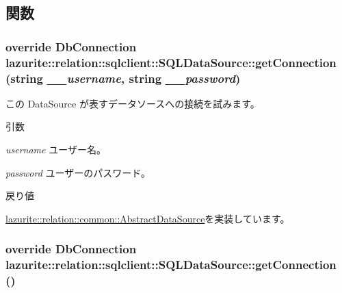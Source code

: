 \subsection{関数}
\hypertarget{classlazurite_1_1relation_1_1sqlclient_1_1_s_q_l_data_source_a49e9bb60b11cb3d984257702a566e869}{
\subsubsection[{getConnection}]{\setlength{\rightskip}{0pt plus 5cm}override DbConnection lazurite::relation::sqlclient::SQLDataSource::getConnection (string {\em \_\-\_\-username}, \/  string {\em \_\-\_\-password})}}
\label{classlazurite_1_1relation_1_1sqlclient_1_1_s_q_l_data_source_a49e9bb60b11cb3d984257702a566e869}


この DataSource が表すデータソースへの接続を試みます。 
\begin{DoxyParams}{引数}
\item[{\em username}]ユーザー名。\item[{\em password}]ユーザーのパスワード。\end{DoxyParams}
\begin{DoxyReturn}{戻り値}

\end{DoxyReturn}


\hyperlink{classlazurite_1_1relation_1_1common_1_1_abstract_data_source_a1e828b5e7c1e29b21439d910f05005aa}{lazurite::relation::common::AbstractDataSource}を実装しています。\hypertarget{classlazurite_1_1relation_1_1sqlclient_1_1_s_q_l_data_source_a99a7bdaa7ca6fce82a89f537a72b2e23}{
\subsubsection[{getConnection}]{\setlength{\rightskip}{0pt plus 5cm}override DbConnection lazurite::relation::sqlclient::SQLDataSource::getConnection ()}}
\label{classlazurite_1_1relation_1_1sqlclient_1_1_s_q_l_data_source_a99a7bdaa7ca6fce82a89f537a72b2e23}



